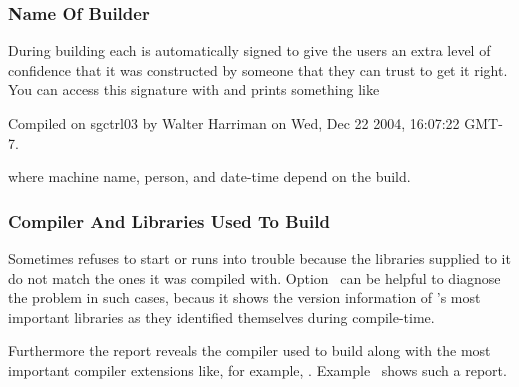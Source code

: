 \subsubsection[Builder]{Name Of Builder
  \label{sec:name-of-builder}
  }

During building each \appcmd{} is automatically signed to give the
users an extra level of confidence that it was constructed by someone
that they can trust to get it right.  You can access this signature
with  and \App{} prints something like

\begin{literal}
  Compiled on sgctrl03 by Walter Harriman on Wed, Dec 22 2004, 16:07:22 GMT-7.
\end{literal}

\noindent where machine name, person, and date-time depend on the
build.


\subsubsection[Compiler And Libraries]{Compiler And Libraries Used To Build
  \label{sec:compiler-and-libraries}
  }

Sometimes \appcmd{} refuses to start or runs into trouble because the
libraries supplied to it do not match the ones it was compiled with.
Option~ can be helpful to diagnose
the problem in such cases, becaus it shows the version information of
\App's most important libraries as they identified themselves during
compile-time.

Furthermore the report reveals the compiler used to build \appcmd{}
along with the most important compiler extensions like, for example,
.  Example~ shows
such a report.

